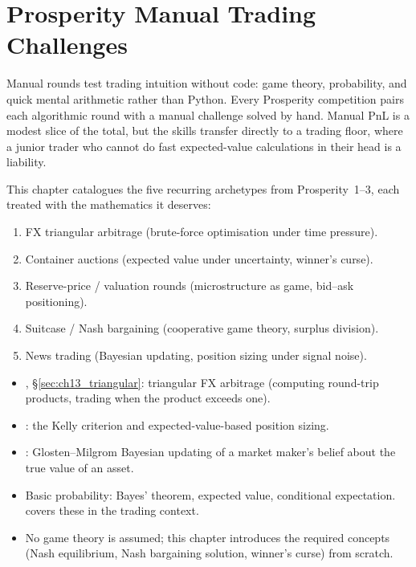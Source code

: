 \chapter{Prosperity Manual Trading Challenges}
\label{ch:manual_rounds}

Manual rounds test trading intuition without code: game theory,
probability, and quick mental arithmetic rather than Python.  Every
Prosperity competition pairs each algorithmic round with a manual
challenge solved by hand.  Manual PnL is a modest slice of the total,
but the skills transfer directly to a trading floor, where a junior
trader who cannot do fast expected-value calculations in their head
is a liability.

This chapter catalogues the five recurring archetypes from
Prosperity~1--3, each treated with the mathematics it deserves:
\begin{enumerate}
  \item FX triangular arbitrage (brute-force optimisation under
  time pressure).
  \item Container auctions (expected value under uncertainty,
  winner's curse).
  \item Reserve-price / valuation rounds (microstructure as game,
  bid--ask positioning).
  \item Suitcase / Nash bargaining (cooperative game theory,
  surplus division).
  \item News trading (Bayesian updating, position sizing under
  signal noise).
\end{enumerate}

\begin{backgroundbox}[Prerequisites]
\begin{itemize}
  \item {}, \S\ref{sec:ch13_triangular}:
  triangular FX arbitrage (computing round-trip products,
  trading when the product exceeds one).
  \item {}: the Kelly criterion and
  expected-value-based position sizing.
  \item {}: Glosten--Milgrom Bayesian updating
  of a market maker's belief about the true value of an asset.
  \item Basic probability: Bayes' theorem, expected value,
  conditional expectation.  covers these
  in the trading context.
  \item No game theory is assumed; this chapter introduces the
  required concepts (Nash equilibrium, Nash bargaining solution,
  winner's curse) from scratch.
\end{itemize}
\end{backgroundbox}

